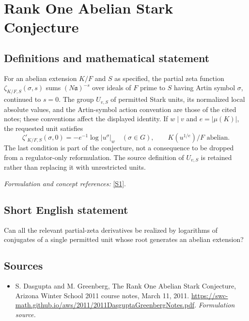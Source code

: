 \documentclass[11pt]{article}
\begin{document}
\section*{\texorpdfstring{Rank One Abelian Stark Conjecture}{Rank One Abelian Stark Conjecture}}\label{198}
\subsection{Definitions and mathematical statement}
For an abelian extension $K/F$ and $S$ as specified, the partial zeta function $\zeta_{K/F,S}(\sigma,s)$ sums $(N\mathfrak a)^{-s}$ over ideals of $F$ prime to $S$ having Artin symbol $\sigma$, continued to $s=0$. The group $U_{v,S}$ of permitted Stark units, its normalized local absolute values, and the Artin-symbol action convention are those of the cited notes; these conventions affect the displayed identity. If $w\mid v$ and $e=|\mu(K)|$, the requested unit satisfies
\[
 \zeta'_{K/F,S}(\sigma,0)=-e^{-1}\log|u^\sigma|_w
 \quad(\sigma\in G),\qquad K(u^{1/e})/F\text{ abelian}.
\]
The last condition is part of the conjecture, not a consequence to be dropped from a regulator-only reformulation. The source definition of $U_{v,S}$ is retained rather than replacing it with unrestricted units.
\par\smallskip\textit{Formulation and concept references:} \href{https://swc-math.github.io/aws/2011/2011DasguptaGreenbergNotes.pdf}{[S1]}.

\subsection{Short English statement}
Can all the relevant partial-zeta derivatives be realized by logarithms of conjugates of a single permitted unit whose root generates an abelian extension?
\subsection{Sources}
\begin{itemize}
\item[S1]S. Dasgupta and M. Greenberg, The Rank One Abelian Stark Conjecture, Arizona Winter School 2011 course notes, March 11, 2011.
\url{https://swc-math.github.io/aws/2011/2011DasguptaGreenbergNotes.pdf}.
\textit{Formulation source.}
\end{itemize}
\end{document}
